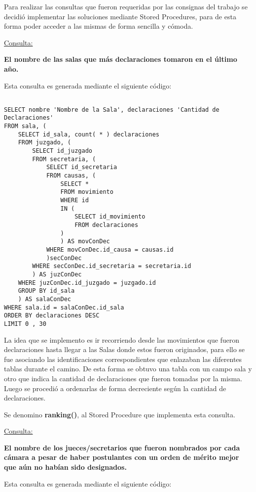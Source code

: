 Para realizar las consultas que fueron requeridas por las consignas del trabajo se decidió implementar las soluciones mediante Stored Procedures, para de esta forma poder acceder a las mismas de forma sencilla y cómoda.

\underline{Consulta:}

\textbf{El nombre de las salas que más declaraciones tomaron en el último año.}

Esta consulta es generada mediante el siguiente código:

\begin{verbatim}

SELECT nombre 'Nombre de la Sala', declaraciones 'Cantidad de Declaraciones'
FROM sala, (
	SELECT id_sala, count( * ) declaraciones
	FROM juzgado, (
		SELECT id_juzgado
		FROM secretaria, (
			SELECT id_secretaria
			FROM causas, (
				SELECT *
				FROM movimiento
				WHERE id
				IN (
					SELECT id_movimiento
					FROM declaraciones
				)
				) AS movConDec
			WHERE movConDec.id_causa = causas.id
			)secConDec
		WHERE secConDec.id_secretaria = secretaria.id
		) AS juzConDec
	WHERE juzConDec.id_juzgado = juzgado.id
	GROUP BY id_sala
	) AS salaConDec
WHERE sala.id = salaConDec.id_sala
ORDER BY declaraciones DESC
LIMIT 0 , 30

\end{verbatim}

La idea que se implemento es ir recorriendo desde las movimientos que fueron declaraciones hasta llegar a las Salas donde estos fueron originados, para ello se fue asociando las identificaciones correspondientes que enlazaban las diferentes tablas durante el camino. De esta forma se obtuvo una tabla con un campo sala y otro que indica la cantidad de declaraciones que fueron tomadas por la misma. Luego se procedió a ordenarlas de forma decreciente según la cantidad de declaraciones.

Se denomino \textbf{ranking()}, al Stored Procedure que implementa esta consulta.

\bigskip


\underline{Consulta:}

\textbf{El nombre de los jueces/secretarios que fueron nombrados por cada cámara a pesar de haber postulantes con un orden de mérito mejor que aún no habían sido designados.}

Esta consulta es generada mediante el siguiente código:

